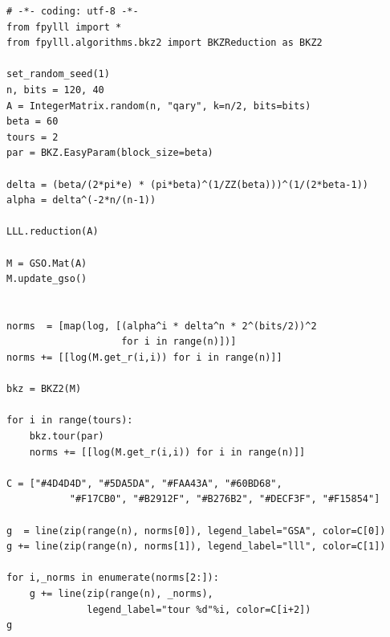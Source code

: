\documentclass[10pt,a4paper,nobib]{tufte-handout}
\begin{document}
\lstset{language=Python,label= ,caption= ,captionpos=b,numbers=none}
\begin{lstlisting}
# -*- coding: utf-8 -*-
from fpylll import *
from fpylll.algorithms.bkz2 import BKZReduction as BKZ2

set_random_seed(1)
n, bits = 120, 40
A = IntegerMatrix.random(n, "qary", k=n/2, bits=bits)
beta = 60
tours = 2
par = BKZ.EasyParam(block_size=beta)

delta = (beta/(2*pi*e) * (pi*beta)^(1/ZZ(beta)))^(1/(2*beta-1))
alpha = delta^(-2*n/(n-1))

LLL.reduction(A)

M = GSO.Mat(A)
M.update_gso()


norms  = [map(log, [(alpha^i * delta^n * 2^(bits/2))^2
                    for i in range(n)])]
norms += [[log(M.get_r(i,i)) for i in range(n)]]

bkz = BKZ2(M)

for i in range(tours):
    bkz.tour(par)
    norms += [[log(M.get_r(i,i)) for i in range(n)]]
        
C = ["#4D4D4D", "#5DA5DA", "#FAA43A", "#60BD68", 
           "#F17CB0", "#B2912F", "#B276B2", "#DECF3F", "#F15854"]

g  = line(zip(range(n), norms[0]), legend_label="GSA", color=C[0])
g += line(zip(range(n), norms[1]), legend_label="lll", color=C[1])

for i,_norms in enumerate(norms[2:]):
    g += line(zip(range(n), _norms), 
              legend_label="tour %d"%i, color=C[i+2])
g
\end{lstlisting}
\end{document}
